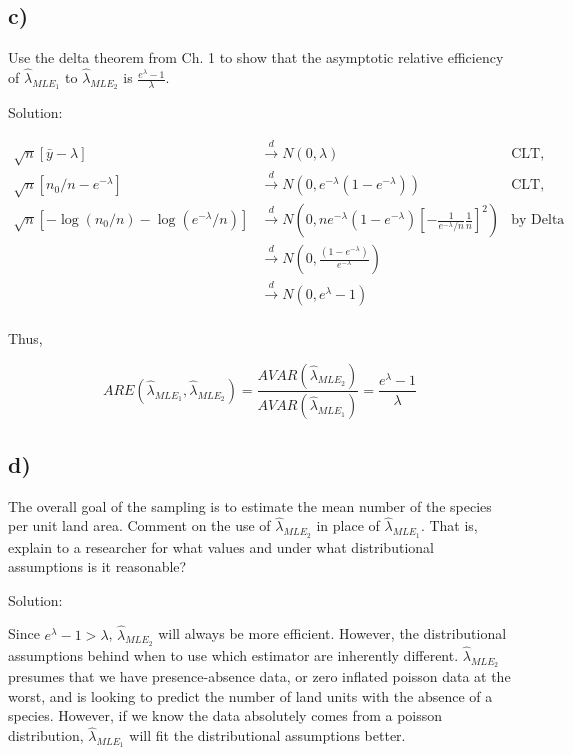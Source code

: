 \documentclass[
  letterpaper,
  DIV=11,
  numbers=noendperiod]{scrreprt}
\begin{document}
\hypertarget{c-1}{%
\subsection{c)}\label{c-1}}

Use the delta theorem from Ch. 1 to show that the asymptotic relative
efficiency of \(\hat{\lambda}_{MLE_1}\) to \(\hat{\lambda}_{MLE_2}\) is
\(\frac{e^{\lambda}-1}{\lambda}\).

Solution:

\[
\begin{aligned}
\sqrt n [\bar{y} - \lambda] &\overset {d}{\to} N(0,\lambda) &\text{CLT, poisson distribution}\\
\sqrt n [n_0/n - e^{-\lambda}] &\overset {d}{\to} N(0,e^{-\lambda}(1-e^{-\lambda})) &\text{CLT, bernoulli distribution} \\
\sqrt n [-\log(n_0/n) - \log(e^{-\lambda}/n)] &\overset {d}{\to} N\left(0,ne^{-\lambda}(1-e^{-\lambda})\left[-\frac{1}{e^{-\lambda}/n}\frac{1}{n}\right]^2 \right) & \text{by Delta Method} \\
&\overset {d}{\to} N\left(0,\frac{(1-e^{-\lambda})}{e^{-\lambda}} \right) \\
&\overset {d}{\to} N\left(0,e^{\lambda}-1 \right) \\
\end{aligned}
\]

Thus,

\[ARE (\hat{\lambda}_{MLE_1},\hat{\lambda}_{MLE_2}) = \frac{AVAR(\hat{\lambda}_{MLE_2})}{AVAR(\hat{\lambda}_{MLE_1})}= \frac{e^\lambda-1}{\lambda}\]

\hypertarget{d}{%
\subsection{d)}\label{d}}

The overall goal of the sampling is to estimate the mean number of the
species per unit land area. Comment on the use of
\(\hat{\lambda}_{MLE_2}\) in place of \(\hat{\lambda}_{MLE_1}\). That
is, explain to a researcher for what values and under what
distributional assumptions is it reasonable?

Solution:

Since \(e^{\lambda}-1 > \lambda\), \(\hat{\lambda}_{MLE_2}\) will always
be more efficient. However, the distributional assumptions behind when
to use which estimator are inherently different.
\(\hat{\lambda}_{MLE_2}\) presumes that we have presence-absence data,
or zero inflated poisson data at the worst, and is looking to predict
the number of land units with the absence of a species. However, if we
know the data absolutely comes from a poisson distribution,
\(\hat{\lambda}_{MLE_1}\) will fit the distributional assumptions
better.
\end{document}
